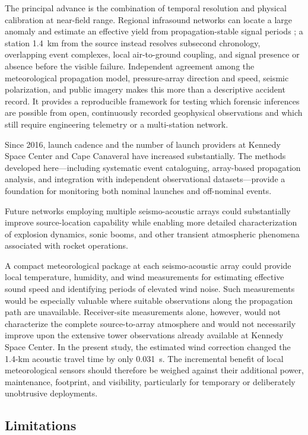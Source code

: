 \documentclass[]{seismica}
\begin{document}
The principal advance is the combination of temporal resolution and physical
calibration at near-field range. Regional infrasound networks can locate a
large anomaly and estimate an effective yield from propagation-stable signal
periods \citep{silber_scamfer_newglenn_2026}; a station 1.4~km from the source
instead resolves subsecond chronology, overlapping event complexes, local
air-to-ground coupling, and signal presence or absence before the visible
failure. Independent agreement among the meteorological propagation model,
pressure-array direction and speed, seismic polarization, and public imagery
makes this more than a descriptive accident record. It provides a reproducible
framework for testing which forensic inferences are possible from open,
continuously recorded geophysical observations and which still require
engineering telemetry or a multi-station network.

Since 2016, launch cadence and the number of launch providers at Kennedy Space Center and Cape Canaveral have increased substantially. The methods developed here---including systematic event cataloguing, array-based propagation analysis, and integration with independent observational datasets---provide a foundation for monitoring both nominal launches and off-nominal events.

Future networks employing multiple seismo-acoustic arrays could substantially improve source-location capability while enabling more detailed characterization of explosion dynamics, sonic booms, and other transient atmospheric phenomena associated with rocket operations.

A compact meteorological package at each seismo-acoustic array could provide
local temperature, humidity, and wind measurements for estimating effective
sound speed and identifying periods of elevated wind noise. Such measurements
would be especially valuable where suitable observations along the propagation
path are unavailable. Receiver-site measurements alone, however, would not
characterize the complete source-to-array atmosphere and would not necessarily
improve upon the extensive tower observations already available at Kennedy
Space Center. In the present study, the estimated wind correction changed the
1.4-km acoustic travel time by only 0.031~s. The incremental benefit of local
meteorological sensors should therefore be weighed against their additional
power, maintenance, footprint, and visibility, particularly for temporary or
deliberately unobtrusive deployments.

\subsection{Limitations}
\label{sec:discussion_limitations}
\end{document}
